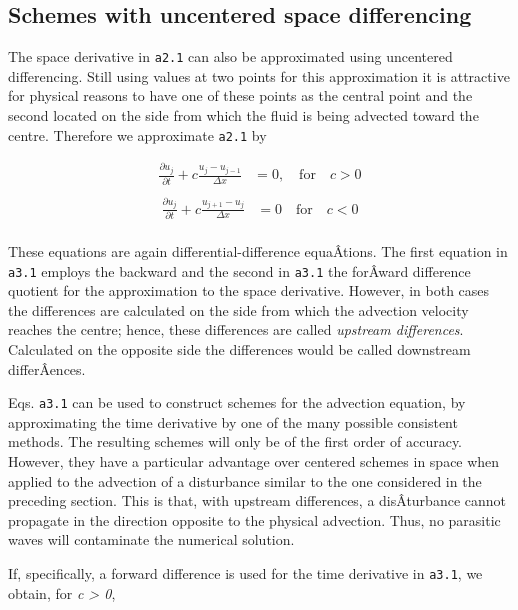 \subsection{\texorpdfstring{\textbf{Schemes with uncentered space
differencing}}{Schemes with uncentered space differencing}}\label{schemes-with-uncentered-space-differencing}

The space derivative in \texttt{a2.1} can also be approximated using
uncentered differencing. Still using values at two points for this
approximation it is attractive for physical reasons to have one of these
points as the central point and the second located on the side from
which the fluid is being advected toward the centre. Therefore we
approximate \texttt{a2.1} by

 {\[\begin{aligned}
     \frac{\partial u_j}{\partial t} + c\frac{u_{j} - u_{j - 1}}{\Delta x} &= 0, \quad \textrm{for}
     \quad c > 0 \\
\end{aligned}\]\[\begin{aligned}
                  \frac{\partial u_j}{\partial t} + c\frac{u_{j+1} - u_{j}}{\Delta x} &= 0 \quad \textrm{for}
                  \quad c < 0 \\
\end{aligned}\]}

These equations are again differential-difference equaÂ­tions. The first
equation in \texttt{a3.1} employs the backward and the second in
\texttt{a3.1} the forÂ­ward difference quotient for the approximation to
the space derivative. However, in both cases the differences are
calculated on the side from which the advection velocity reaches the
centre; hence, these differences are called \emph{upstream differences}.
Calculated on the opposite side the differences would be called
downstream differÂ­ences.

Eqs. \texttt{a3.1} can be used to construct schemes for the advection
equation, by approximating the time derivative by one of the many
possible consistent methods. The resulting schemes will only be of the
first order of accuracy. However, they have a particular advantage over
centered schemes in space when applied to the advection of a disturbance
similar to the one considered in the preceding section. This is that,
with upstream differences, a disÂ­turbance cannot propagate in the
direction opposite to the physical advection. Thus, no parasitic waves
will contaminate the numerical solution.

If, specifically, a forward difference is used for the time derivative
in \texttt{a3.1}, we obtain, for \emph{c \textgreater{} 0},

